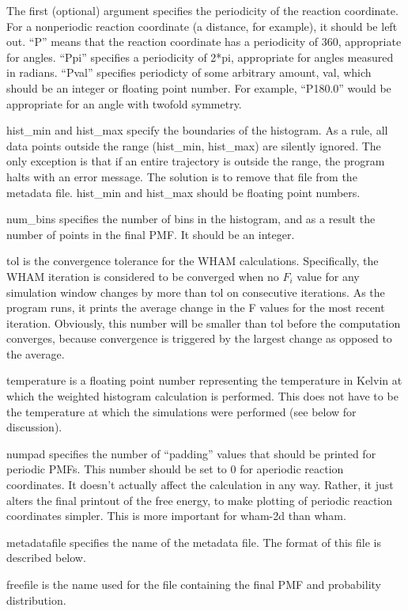 \documentclass[12pt]{article}
\begin{document}
The first (optional) argument specifies the periodicity of the reaction
coordinate.  For a nonperiodic reaction coordinate (a distance, for
example), it should be left out.  ``P'' means that the reaction coordinate
has a periodicity of 360, appropriate for angles. ``Ppi'' specifies a
periodicity of 2*pi, appropriate for angles measured in radians.  ``Pval''
specifies periodicty of some arbitrary amount, val, which should be an
integer or floating point number.  For example, ``P180.0'' would be
appropriate for an angle with twofold symmetry. 

hist\_min and hist\_max specify the boundaries of the histogram.  As a rule,
all data points outside the range (hist\_min, hist\_max) are silently
ignored.  The only exception is that if an entire trajectory is outside the
range, the program halts with an error message.  The solution is to remove
that file from the metadata file.  hist\_min and hist\_max should be floating
point numbers.

num\_bins specifies the number of bins in the histogram, and as a result the
number of points in the final PMF.  It should be an integer.

tol is the convergence tolerance for the WHAM calculations.  Specifically,
the WHAM iteration is considered to be converged when no $F_i$ value for any
simulation window changes by more than tol on consecutive iterations.  As
the program runs, it prints the average change in the F values for the most
recent iteration.  Obviously, this number will be smaller than tol
before the computation converges, because convergence is triggered by the
largest change as opposed to the average.

temperature is a floating point number representing the temperature in
Kelvin at which the weighted histogram calculation is performed.  This does
not have to be the temperature at which the simulations were performed (see
below for discussion).

numpad specifies the number of ``padding'' values that should be printed for
periodic PMFs.  This number should be set to 0 for aperiodic reaction
coordinates.  It doesn't actually affect the calculation in any way.
Rather, it just alters the final printout of the free energy, to make
plotting of periodic reaction coordinates simpler.  This is more important
for wham-2d than wham.

metadatafile specifies the name of the metadata file.  The format of this
file is described below.

freefile is the name used for the file containing the final PMF and
probability distribution.
\end{document}
